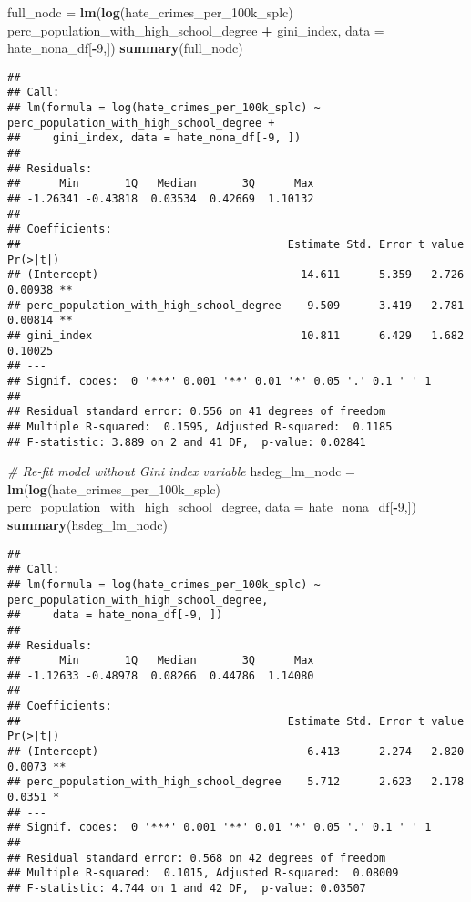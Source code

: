 \documentclass[
]{article}
\newenvironment{Shaded}{\begin{snugshade}}{\end{snugshade}}
\newcommand{\CommentTok}[1]{\textcolor[rgb]{0.56,0.35,0.01}{\textit{#1}}}
\newcommand{\DataTypeTok}[1]{\textcolor[rgb]{0.13,0.29,0.53}{#1}}
\newcommand{\DecValTok}[1]{\textcolor[rgb]{0.00,0.00,0.81}{#1}}
\newcommand{\KeywordTok}[1]{\textcolor[rgb]{0.13,0.29,0.53}{\textbf{#1}}}
\newcommand{\NormalTok}[1]{#1}
\newcommand{\OperatorTok}[1]{\textcolor[rgb]{0.81,0.36,0.00}{\textbf{#1}}}
\newcommand{\StringTok}[1]{\textcolor[rgb]{0.31,0.60,0.02}{#1}}
\begin{document}
\begin{Shaded}
\begin{Highlighting}[]
\NormalTok{full_nodc =}\StringTok{ }\KeywordTok{lm}\NormalTok{(}\KeywordTok{log}\NormalTok{(hate_crimes_per_100k_splc) }\OperatorTok{~}\StringTok{ }\NormalTok{perc_population_with_high_school_degree }\OperatorTok{+}\StringTok{ }\NormalTok{gini_index, }\DataTypeTok{data =}\NormalTok{ hate_nona_df[}\OperatorTok{-}\DecValTok{9}\NormalTok{,])}
\KeywordTok{summary}\NormalTok{(full_nodc)}
\end{Highlighting}
\end{Shaded}

\begin{verbatim}
## 
## Call:
## lm(formula = log(hate_crimes_per_100k_splc) ~ perc_population_with_high_school_degree + 
##     gini_index, data = hate_nona_df[-9, ])
## 
## Residuals:
##      Min       1Q   Median       3Q      Max 
## -1.26341 -0.43818  0.03534  0.42669  1.10132 
## 
## Coefficients:
##                                         Estimate Std. Error t value Pr(>|t|)   
## (Intercept)                              -14.611      5.359  -2.726  0.00938 **
## perc_population_with_high_school_degree    9.509      3.419   2.781  0.00814 **
## gini_index                                10.811      6.429   1.682  0.10025   
## ---
## Signif. codes:  0 '***' 0.001 '**' 0.01 '*' 0.05 '.' 0.1 ' ' 1
## 
## Residual standard error: 0.556 on 41 degrees of freedom
## Multiple R-squared:  0.1595, Adjusted R-squared:  0.1185 
## F-statistic: 3.889 on 2 and 41 DF,  p-value: 0.02841
\end{verbatim}

\begin{Shaded}
\begin{Highlighting}[]
\CommentTok{# Re-fit model without Gini index variable}
\NormalTok{hsdeg_lm_nodc =}\StringTok{ }\KeywordTok{lm}\NormalTok{(}\KeywordTok{log}\NormalTok{(hate_crimes_per_100k_splc) }\OperatorTok{~}\StringTok{ }\NormalTok{perc_population_with_high_school_degree, }\DataTypeTok{data =}\NormalTok{ hate_nona_df[}\OperatorTok{-}\DecValTok{9}\NormalTok{,])}
\KeywordTok{summary}\NormalTok{(hsdeg_lm_nodc)}
\end{Highlighting}
\end{Shaded}

\begin{verbatim}
## 
## Call:
## lm(formula = log(hate_crimes_per_100k_splc) ~ perc_population_with_high_school_degree, 
##     data = hate_nona_df[-9, ])
## 
## Residuals:
##      Min       1Q   Median       3Q      Max 
## -1.12633 -0.48978  0.08266  0.44786  1.14080 
## 
## Coefficients:
##                                         Estimate Std. Error t value Pr(>|t|)   
## (Intercept)                               -6.413      2.274  -2.820   0.0073 **
## perc_population_with_high_school_degree    5.712      2.623   2.178   0.0351 * 
## ---
## Signif. codes:  0 '***' 0.001 '**' 0.01 '*' 0.05 '.' 0.1 ' ' 1
## 
## Residual standard error: 0.568 on 42 degrees of freedom
## Multiple R-squared:  0.1015, Adjusted R-squared:  0.08009 
## F-statistic: 4.744 on 1 and 42 DF,  p-value: 0.03507
\end{verbatim}
\end{document}
